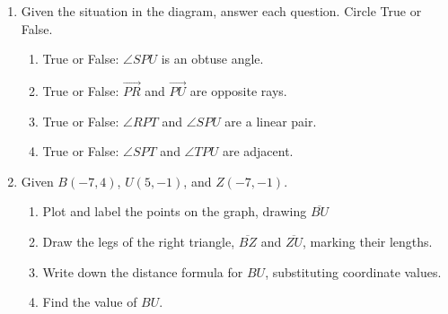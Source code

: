 \documentclass[12pt, twoside]{article}
\begin{document}
\begin{enumerate}
\newpage
\item Given the situation in the diagram, answer each question. Circle True or False. %
    \begin{flushright}
    \end{flushright}
  \begin{enumerate}
    \item True or False: $\angle SPU$ is an obtuse angle.
    \item True or False: $\overrightarrow{PR}$ and $\overrightarrow{PU}$ are opposite rays.
    \item True or False: $\angle RPT$ and $\angle SPU$ are a linear pair.
    \item True or False: $\angle SPT$ and $\angle TPU$ are adjacent.
  \end{enumerate}

\item Given $B(-7, 4)$, $U(5, -1)$, and $Z(-7, -1)$.
\begin{enumerate}
  \item Plot and label the points on the graph, drawing $\overline{BU}$
  \item Draw the legs of the right triangle, $\overline{BZ}$ and $\overline{ZU}$, marking their lengths.
  \item Write down the distance formula for $BU$, substituting coordinate values.
  \item Find the value of $BU$.
\end{enumerate}


\end{enumerate}
\end{document}
